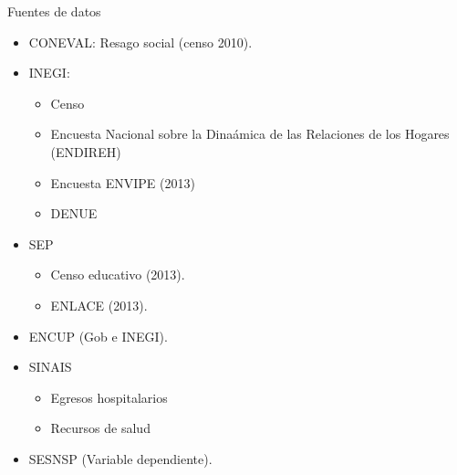 \documentclass[ignorenonframetext,]{beamer}
\begin{document}
\begin{frame}{Fuentes de datos}

\begin{itemize}
\itemsep1pt\parskip0pt
\item
  CONEVAL: Resago social (censo 2010).
\item
  INEGI:

  \begin{itemize}
  \itemsep1pt\parskip0pt
  \item
    Censo
  \item
    Encuesta Nacional sobre la Dinaámica de las Relaciones de los
    Hogares (ENDIREH)
  \item
    Encuesta ENVIPE (2013)
  \item
    DENUE
  \end{itemize}
\item
  SEP

  \begin{itemize}
  \itemsep1pt\parskip0pt
  \item
    Censo educativo (2013).
  \item
    ENLACE (2013).
  \end{itemize}
\item
  ENCUP (Gob e INEGI).
\item
  SINAIS

  \begin{itemize}
  \itemsep1pt\parskip0pt
  \item
    Egresos hospitalarios
  \item
    Recursos de salud
  \end{itemize}
\item
  SESNSP (Variable dependiente).
\end{itemize}

\end{frame}
\end{document}
